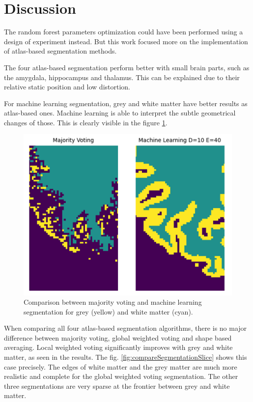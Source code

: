 \section*{Discussion}
The random forest parameters optimization could have been performed using a design of experiment instead. But this work focused more on the implementation of atlas-based segmentation methods.

The four atlas-based segmentation perform better with small brain parts, such as the amygdala, hippocampus and thalamus. This can be explained due to their relative static position and low distortion. 

For machine learning segmentation, grey and white matter have better results as atlas-based ones. Machine learning is able to interpret the subtle geometrical changes of those. This is clearly visible in the figure \ref{fig:compareGreyMatter}.

\begin{figure}[h!]
	\centering
	\includegraphics[width=\linewidth]{img/compareGreyMatter}
	\caption{Comparison between majority voting and machine learning segmentation for grey (yellow) and white matter (cyan).}
	\label{fig:compareGreyMatter}
\end{figure}

When comparing all four atlas-based segmentation algorithms, there is no major difference between majority voting, global weighted voting and shape based averaging. Local weighted voting significantly improves with grey and white matter, as seen in the results. The fig. \ref{fig:compareSegmentationSlice} shows this case precisely. The edges of white matter and the grey matter are much more realistic and complete for the global weighted voting segmentation. The other three segmentations are very sparse at the frontier between grey and white matter.

